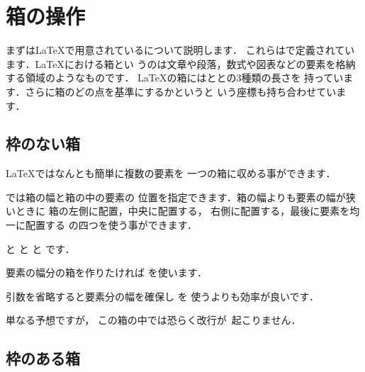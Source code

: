 \section{箱の操作}
まずは{\LaTeX}で用意されている{}について説明します．
これらはで定義されています．{\LaTeX}における箱とい
うのは文章や段落，数式や図表などの要素を格納する領域のようなものです．
{\LaTeX}の箱にはととの3種類の長さを
持っています．さらに箱のどの点を基準にするかというと
いう座標も持ち合わせています．

\subsection{枠のない箱}
{\LaTeX}ではなんとも簡単に複数の要素を
一つの箱に収める事ができます．
\begin{Syntax}
\end{Syntax}

では箱の幅と箱の中の要素の%
位置を指定できます．箱の幅よりも要素の幅が狭いときに
箱の左側に配置，中央に配置する，
右側に配置する，最後に要素を均一に配置する
の四つを使う事ができます．
\begin{InOut}
と
と
と
です．
\end{InOut}
要素の幅分の箱を作りたければ を使います．
\begin{Syntax}
\end{Syntax}
引数を省略すると要素分の幅を確保し を
使うよりも効率が良いです．
\begin{InOut}
\hspace*{\fill} 単なる予想ですが，
この箱の中では恐らく\mbox{改行が
起こりません．} 
\end{InOut}

\subsection{枠のある箱}


